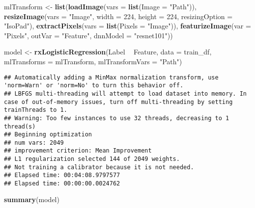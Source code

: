 \documentclass[]{book}
\newenvironment{Shaded}{\begin{snugshade}}{\end{snugshade}}
\newcommand{\KeywordTok}[1]{\textcolor[rgb]{0.13,0.29,0.53}{\textbf{#1}}}
\newcommand{\DataTypeTok}[1]{\textcolor[rgb]{0.13,0.29,0.53}{#1}}
\newcommand{\DecValTok}[1]{\textcolor[rgb]{0.00,0.00,0.81}{#1}}
\newcommand{\StringTok}[1]{\textcolor[rgb]{0.31,0.60,0.02}{#1}}
\newcommand{\OperatorTok}[1]{\textcolor[rgb]{0.81,0.36,0.00}{\textbf{#1}}}
\newcommand{\NormalTok}[1]{#1}
\theoremstyle{definition}
\theoremstyle{definition}
\theoremstyle{definition}
\theoremstyle{remark}
\begin{document}
\begin{Shaded}
\begin{Highlighting}[]
\NormalTok{mlTransform <-}\StringTok{ }\KeywordTok{list}\NormalTok{(}\KeywordTok{loadImage}\NormalTok{(}\DataTypeTok{vars =} \KeywordTok{list}\NormalTok{(}\DataTypeTok{Image =} \StringTok{"Path"}\NormalTok{)),}
                    \KeywordTok{resizeImage}\NormalTok{(}\DataTypeTok{vars =} \StringTok{"Image"}\NormalTok{, }
                                \DataTypeTok{width =} \DecValTok{224}\NormalTok{, }\DataTypeTok{height =} \DecValTok{224}\NormalTok{, }
                                \DataTypeTok{resizingOption =} \StringTok{"IsoPad"}\NormalTok{),}
                    \KeywordTok{extractPixels}\NormalTok{(}\DataTypeTok{vars =} \KeywordTok{list}\NormalTok{(}\DataTypeTok{Pixels =} \StringTok{"Image"}\NormalTok{)),}
                    \KeywordTok{featurizeImage}\NormalTok{(}\DataTypeTok{var =} \StringTok{"Pixels"}\NormalTok{, }\DataTypeTok{outVar =} \StringTok{"Feature"}\NormalTok{, }
                                   \DataTypeTok{dnnModel =} \StringTok{"resnet101"}\NormalTok{))}

\NormalTok{model <-}\StringTok{ }\KeywordTok{rxLogisticRegression}\NormalTok{(Label }\OperatorTok{~}\StringTok{ }\NormalTok{Feature, }
                              \DataTypeTok{data =}\NormalTok{ train_df,}
                              \DataTypeTok{mlTransforms =}\NormalTok{ mlTransform, }\DataTypeTok{mlTransformVars =} \StringTok{"Path"}\NormalTok{)}
\end{Highlighting}
\end{Shaded}

\begin{verbatim}
## Automatically adding a MinMax normalization transform, use 'norm=Warn' or 'norm=No' to turn this behavior off.
## LBFGS multi-threading will attempt to load dataset into memory. In case of out-of-memory issues, turn off multi-threading by setting trainThreads to 1.
## Warning: Too few instances to use 32 threads, decreasing to 1 thread(s)
## Beginning optimization
## num vars: 2049
## improvement criterion: Mean Improvement
## L1 regularization selected 144 of 2049 weights.
## Not training a calibrator because it is not needed.
## Elapsed time: 00:04:08.9797577
## Elapsed time: 00:00:00.0024762
\end{verbatim}

\begin{Shaded}
\begin{Highlighting}[]
\KeywordTok{summary}\NormalTok{(model)}
\end{Highlighting}
\end{Shaded}
\end{document}
